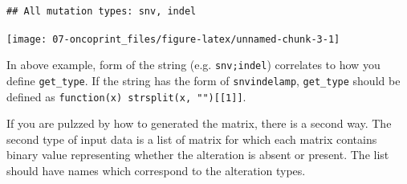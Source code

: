 \documentclass[]{book}
\newenvironment{Shaded}{\begin{snugshade}}{\end{snugshade}}
\newcommand{\KeywordTok}[1]{\textcolor[rgb]{0.13,0.29,0.53}{\textbf{#1}}}
\newcommand{\DataTypeTok}[1]{\textcolor[rgb]{0.13,0.29,0.53}{#1}}
\newcommand{\DecValTok}[1]{\textcolor[rgb]{0.00,0.00,0.81}{#1}}
\newcommand{\StringTok}[1]{\textcolor[rgb]{0.31,0.60,0.02}{#1}}
\newcommand{\OperatorTok}[1]{\textcolor[rgb]{0.81,0.36,0.00}{\textbf{#1}}}
\newcommand{\NormalTok}[1]{#1}
\theoremstyle{definition}
\theoremstyle{definition}
\theoremstyle{definition}
\theoremstyle{remark}
\begin{document}
\begin{verbatim}
## All mutation types: snv, indel
\end{verbatim}

\begin{center}\texttt{[image: 07-oncoprint\_files/figure-latex/unnamed-chunk-3-1]} \end{center}

In above example, form of the string (e.g. \texttt{snv;indel})
correlates to how you define \texttt{get\_type}. If the string has the
form of \texttt{snv\textbar{}indel\textbar{}amp}, \texttt{get\_type}
should be defined as
\texttt{function(x)\ strsplit(x,\ "\textbar{}"){[}{[}1{]}{]}}.

If you are pulzzed by how to generated the matrix, there is a second
way. The second type of input data is a list of matrix for which each
matrix contains binary value representing whether the alteration is
absent or present. The list should have names which correspond to the
alteration types.

\begin{Shaded}
\end{Shaded}
\end{document}
